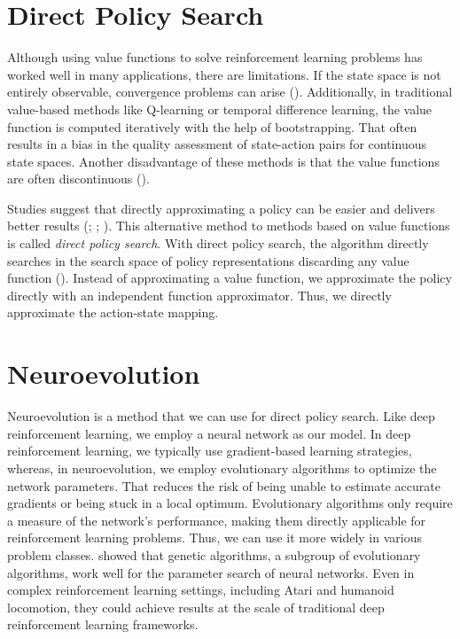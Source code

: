 \section{Direct Policy Search}
Although using value functions to solve reinforcement learning problems has worked well in many applications, there are limitations. If the state space is not entirely observable, convergence problems can arise (\cite{el2005direct}). Additionally, in traditional value-based methods like Q-learning or temporal difference learning, the value function is computed iteratively with the help of bootstrapping. That often results in a bias in the quality assessment of state-action pairs for continuous state spaces. Another disadvantage of these methods is that the value functions are often discontinuous (\cite{deisenroth2013survey}).

Studies suggest that directly approximating a policy can be easier and delivers better results (\cite{DBLP:journals/corr/abs-1806-01363}; \cite{sutton1999policy}; \cite{anderson2000approximating}). This alternative method to methods based on value functions is called \textit{direct policy search}. With direct policy search, the algorithm directly searches in the search space of policy representations discarding any value function (\cite{wierstra2010study}). Instead of approximating a value function, we approximate the policy directly with an independent function approximator. Thus, we directly approximate the action-state mapping.


\section{Neuroevolution}
Neuroevolution is a method that we can use for direct policy search. Like deep reinforcement learning, we employ a neural network as our model. In deep reinforcement learning, we typically use gradient-based learning strategies, whereas, in neuroevolution, we employ evolutionary algorithms to optimize the network parameters. That reduces the risk of being unable to estimate accurate gradients or being stuck in a local optimum. Evolutionary algorithms only require a measure of the network's performance, making them directly applicable for reinforcement learning problems. Thus, we can use it more widely in various problem classes. \cite{such2017deep} showed that genetic algorithms, a subgroup of evolutionary algorithms, work well for the parameter search of neural networks. Even in complex reinforcement learning settings, including Atari and humanoid locomotion, they could achieve results at the scale of traditional deep reinforcement learning frameworks.

